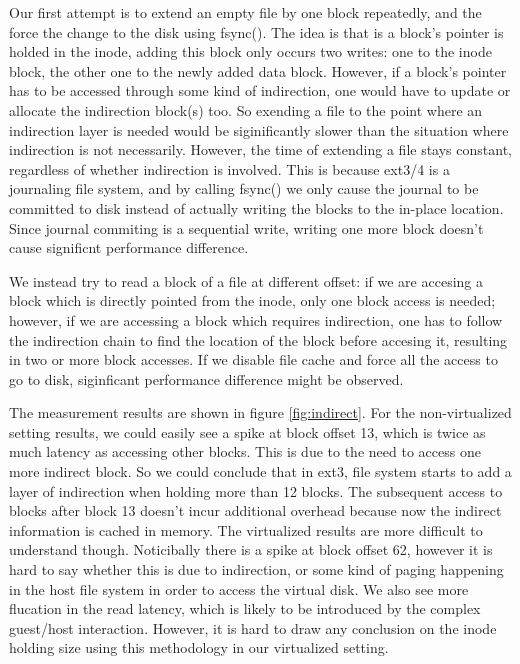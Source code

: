 Our first attempt is to extend an empty file by one block repeatedly, and the force the change to the disk using fsync(). The idea is that is a block's pointer is holded in the inode, adding this block only occurs two writes: one to the inode block, the other one to the newly added data block. However, if a block's pointer has to be accessed through some kind of indirection, one would have to update or allocate the indirection block(s) too. So exending a file to the point where an indirection layer is needed would be siginificantly slower than the situation where indirection is not necessarily. However, the time of extending a file stays constant, regardless of whether indirection is involved. This is because ext3/4 is a journaling file system, and by calling fsync() we only cause the journal to be committed to disk instead of actually writing the blocks to the in-place location. Since journal commiting is a sequential write, writing one more block doesn't cause significnt performance difference.

We instead try to read a block of a file at different offset: if we are accesing a block which is directly pointed from the inode, only one block access is needed; however, if we are accessing a block which requires indirection, one has to follow the indirection chain to find the location of the block before accesing it, resulting in two or more block accesses. If we disable file cache and force all the access to go to disk, siginficant performance difference might be observed. 

The measurement results are shown in figure \ref{fig:indirect}. For the non-virtualized setting results, we could easily see a spike at block offset 13, which is twice as much latency as accessing other blocks. This is due to the need to access one more indirect block. So we could conclude that in ext3, file system starts to add a layer of indirection when holding more than 12 blocks. The subsequent access to blocks after block 13 doesn't incur additional overhead because now the indirect information is cached in memory. The virtualized results are more difficult to understand though. Noticibally there is a spike at block offset 62, however it is hard to say whether this is due to indirection, or some kind of paging happening in the host file system in order to access the virtual disk. We also see more flucation in the read latency, which is likely to be introduced by the complex guest/host interaction. However, it is hard to draw any conclusion on the inode holding size using this methodology in our virtualized setting. 
